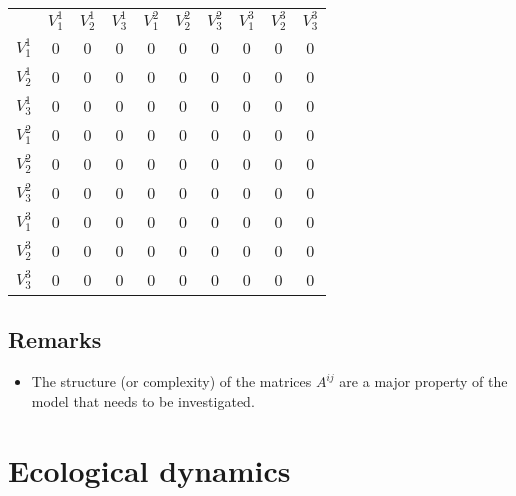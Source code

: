 \documentclass[
12.5pt, 					%
a4paper, 				%
oneside,					%
headinclude,footinclude, %
BCOR5mm, 				%
abstract=on
]{scrreprt}
\numberwithin{equation}{chapter}
\newcommand\Tstrut{\rule{0pt}{3.6ex}}       %
\newcommand\Bstrut{\rule[-0.9ex]{0pt}{0pt}} %
\begin{document}
\begin{table}[H]
	\captionsetup{format=plain}
    \begin{center}
    \begin{tabular}{ c : c c c : c c c : c c c }
    
    	 		& $V^1_1$	& $V^1_2$ & $V^1_3$ & $V^2_1$ & $V^2_2$ & $V^2_3$ & $V^3_1$ & $V^3_2$ & $V^3_3$\\
    
    \Bstrut $V^1_1$ 	& 0	& 0 & 0 & 0 & 0 & 0 &  0 & 0 & 0 \Tstrut\\
    \Bstrut $V^1_2$ 	& 0	& 0 & 0 & 0 & 0 & 0 &  0 & 0 & 0 \Tstrut\\
    \Bstrut $V^1_3$ 	& 0	& 0 & 0 & 0 & 0 & 0 &  0 & 0 & 0 \Tstrut\\
    	\hdashline
    \Bstrut $V^2_1$ 	& 0	& 0 & 0 & 0 & 0 & 0 &  0 & 0 & 0 \Tstrut\\
   \Bstrut  $V^2_2$ 	& 0	& 0 & 0 & 0 & 0 & 0 &  0 & 0 & 0 \Tstrut\\
    \Bstrut $V^2_3$ 	& 0	& 0 & 0 & 0 & 0 & 0 &  0 & 0 & 0 \Tstrut\\
    \hdashline
    \Bstrut $V^3_1$	& 0	& 0 & 0 & 0 & 0 & 0 &  0 & 0 & 0 \Tstrut\\
    \Bstrut $V^3_2$ 	& 0	& 0 & 0 & 0 & 0 & 0 & 0 & 0 & 0 \Tstrut\\
   \Bstrut $V^3_3$	& 0	& 0 & 0 & 0 & 0 & 0 &  0 & 0 & 0 \Tstrut\\

	\end{tabular}
	
	
  	\end{center}
  	
\end{table}



\subsection*{Remarks}

\begin{itemize}
\item The structure (or complexity) of the matrices $A^{ij}$ are a major property of the model that needs to be investigated.

\end{itemize}


\section*{Ecological dynamics}
\end{document}
